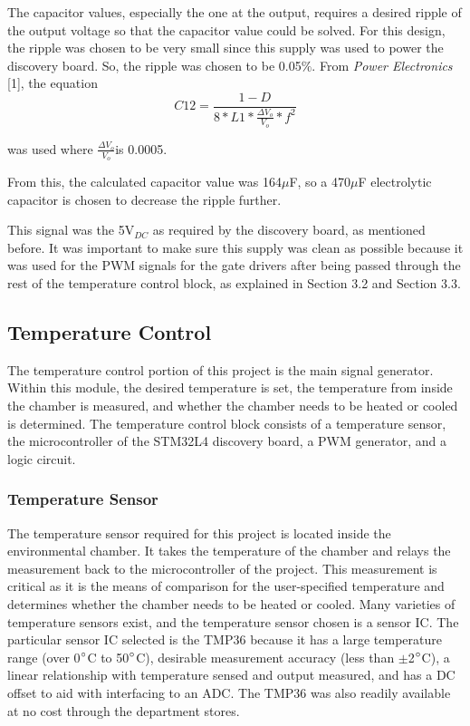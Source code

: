 \documentclass[11pt,letter]{article}
\begin{document}
The capacitor values, especially the one at the output, requires a desired ripple of the output voltage so that the capacitor value could be solved. For this design, the ripple was chosen to be very small since this supply was used to power the discovery board. So, the ripple was chosen to be 0.05$\%$. From \textit{Power Electronics} [1], the equation
\begin{equation}
    C12 = \frac{1-D}{8*L1*\frac{\Delta V_o}{V_o}*f^2}
\end{equation}

was used where $\frac{\Delta V_o}{V_o}$is 0.0005. 

From this, the calculated capacitor value was 164$\mu$F, so a 470$\mu$F electrolytic capacitor is chosen to decrease the ripple further.

This signal was the 5V$_{DC}$ as required by the discovery board, as mentioned before. It was important to make sure this supply was clean as possible because it was used for the PWM signals for the gate drivers after being passed through the rest of the temperature control block, as explained in Section 3.2 and Section 3.3. 

\subsection{Temperature Control}

The temperature control portion of this project is the main signal generator. Within this module, the desired temperature is set, the temperature from inside the chamber is measured, and whether the chamber needs to be heated or cooled is determined. The temperature control block consists of a temperature sensor, the microcontroller of the STM32L4 discovery board, a PWM generator, and a logic circuit.

\subsubsection{Temperature Sensor}

The temperature sensor required for this project is located inside the environmental chamber. It takes the temperature of the chamber and relays the measurement back to the microcontroller of the project. This measurement is critical as it is the means of comparison for the user-specified temperature and determines whether the chamber needs to be heated or cooled. Many varieties of temperature sensors exist, and the temperature sensor chosen is a sensor IC. The particular sensor IC selected is the TMP36 because it has a large temperature range (over 0$\degree$C to 50$\degree$C), desirable measurement accuracy (less than $\pm$2$\degree$C), a linear relationship with temperature sensed and output measured, and has a DC offset to aid with interfacing to an ADC. The TMP36 was also readily available at no cost through the department stores.
\end{document}

